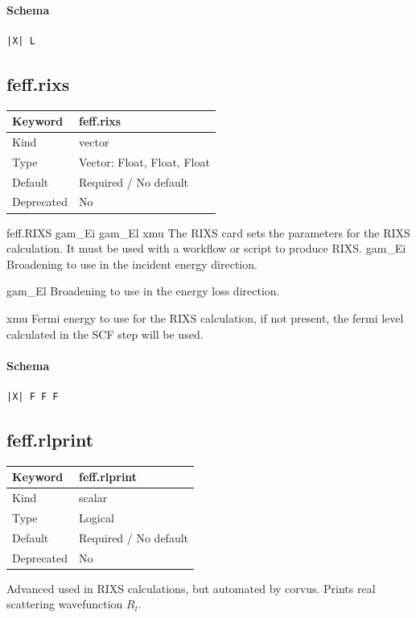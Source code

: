 \documentclass[11pt]{article}
\begin{document}
{{{{\paragraph{Schema}
\begin{Verbatim}
|X| L
\end{Verbatim}

\subsection{feff.rixs}
\label{kw:feff-rixs}
\begin{longtable}{|p{1.5in}|p{4.5in}|}
\hline
Keyword & feff.rixs \\
\hline
Kind & vector \\
\hline
Type & Vector: Float, Float, Float \\
\hline
Default & Required / No default \\
\hline
Deprecated & No \\
\hline
\end{longtable}
 feff.RIXS {gam\_Ei gam\_El xmu}
 The RIXS card sets the parameters for the RIXS calculation. It must be used with a workflow
 or script to produce RIXS.
 gam\_Ei
    Broadening to use in the incident energy direction.

 gam\_El
    Broadening to use in the energy loss direction.

 xmu
    Fermi energy to use for the RIXS calculation, if not present, the fermi level calculated in
    the SCF step will be used.

\paragraph{Schema}
\begin{Verbatim}
|X| F F F
\end{Verbatim}

\subsection{feff.rlprint}
\label{kw:feff-rlprint}
\begin{longtable}{|p{1.5in}|p{4.5in}|}
\hline
Keyword & feff.rlprint \\
\hline
Kind & scalar \\
\hline
Type & Logical \\
\hline
Default & Required / No default \\
\hline
Deprecated & No \\
\hline
\end{longtable}
 Advanced used in RIXS calculations, but automated by corvus. Prints real scattering wavefunction $R_l$.

}}}}
\end{document}
